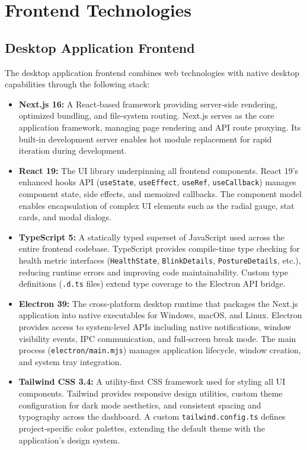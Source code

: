 \documentclass[12pt]{report}
\begin{document}
\section{Frontend Technologies}

\subsection{Desktop Application Frontend}

The desktop application frontend combines web technologies with native desktop capabilities through the following stack:

\begin{itemize}
    \item \textbf{Next.js 16:} A React‑based framework providing server‑side rendering, optimized bundling, and file‑system routing. Next.js serves as the core application framework, managing page rendering and API route proxying. Its built‑in development server enables hot module replacement for rapid iteration during development.
    \item \textbf{React 19:} The UI library underpinning all frontend components. React 19's enhanced hooks API (\texttt{useState}, \texttt{useEffect}, \texttt{useRef}, \texttt{useCallback}) manages component state, side effects, and memoized callbacks. The component model enables encapsulation of complex UI elements such as the radial gauge, stat cards, and modal dialogs.
    \item \textbf{TypeScript 5:} A statically typed superset of JavaScript used across the entire frontend codebase. TypeScript provides compile‑time type checking for health metric interfaces (\texttt{HealthState}, \texttt{BlinkDetails}, \texttt{PostureDetails}, etc.), reducing runtime errors and improving code maintainability. Custom type definitions (\texttt{.d.ts} files) extend type coverage to the Electron API bridge.
    \item \textbf{Electron 39:} The cross‑platform desktop runtime that packages the Next.js application into native executables for Windows, macOS, and Linux. Electron provides access to system‑level APIs including native notifications, window visibility events, IPC communication, and full‑screen break mode. The main process (\texttt{electron/main.mjs}) manages application lifecycle, window creation, and system tray integration.
    \item \textbf{Tailwind CSS 3.4:} A utility‑first CSS framework used for styling all UI components. Tailwind provides responsive design utilities, custom theme configuration for dark mode aesthetics, and consistent spacing and typography across the dashboard. A custom \texttt{tailwind.config.ts} defines project‑specific color palettes, extending the default theme with the application's design system.
\end{itemize}
\end{document}
